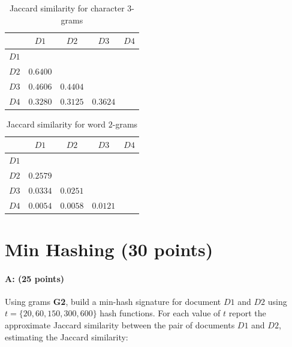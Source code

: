\documentclass[11pt]{article}
\begin{document}
\begin{table}[!ht]  
  \centering
  \caption{Jaccard similarity for character $3$-grams}
  \begin{tabular}{|c|c|c|c|c|}
    \cline{2-5}
    \multicolumn{1}{c|}{} & $D1$ & $D2$ & $D3$ & $D4$\\ \hline
    $D1$ &    &    &   & \\ \hline
    $D2$ & $0.6400$   &    &   & \\ \hline
    $D3$ &  $0.4606$  &  $0.4404$  &   & \\ \hline
    $D4$ & $0.3280$  & $0.3125$  & $0.3624$ & \\ \hline
  \end{tabular}
  \end{table}
  
\begin{table}[!ht]  
  \centering
  \caption{Jaccard similarity for word $2$-grams}
  \begin{tabular}{|c|c|c|c|c|}
    \cline{2-5}
    \multicolumn{1}{c|}{} & $D1$ & $D2$ & $D3$ & $D4$\\ \hline
    $D1$ &    &    &   & \\ \hline
    $D2$ &  $0.2579$  &    &   & \\ \hline
    $D3$ &  $0.0334$  & $0.0251$   &   & \\ \hline
    $D4$ &  $0.0054$ &  $0.0058$ & $0.0121$ & \\ \hline
  \end{tabular}
  \end{table}

\section{Min Hashing (30 points)}
\paragraph{A: (25 points)} 
Using grams \textbf{G2}, build a min-hash signature for document $D1$ and $D2$ using $t = \{20, 60, 150, 300, 600\}$ hash functions. For each value of $t$ report the approximate Jaccard similarity between the pair of documents $D1$ and $D2$, estimating the Jaccard similarity:
\end{document}
